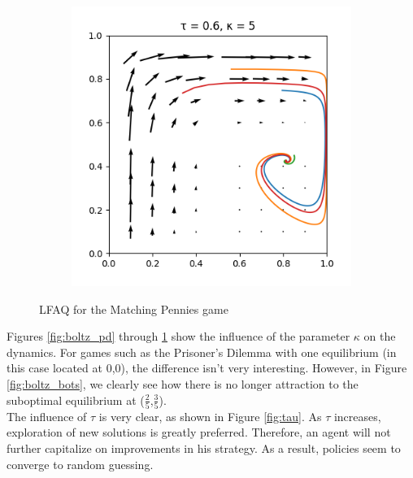 \documentclass[10pt,a4paper]{article}
\begin{document}
\begin{figure}[h]
\begin{subfigure}[b]{0.30\textwidth}
    \end{subfigure}
    \begin{subfigure}[b]{0.30\textwidth}
        \includegraphics[width=\textwidth]{Figures/boltzmann_mp_5.png}
    \end{subfigure}
    \caption{LFAQ for the Matching Pennies game}
    \label{fig:boltz_mp}
\end{figure}

Figures \ref{fig:boltz_pd} through \ref{fig:boltz_mp} show the influence of the parameter $\kappa$ on the dynamics. For games such as the Prisoner's Dilemma with one equilibrium (in this case located at 0,0), the difference isn't very interesting. However, in Figure \ref{fig:boltz_bots}, we clearly see how there is no longer attraction to the suboptimal equilibrium at ($\frac{2}{5}$,$\frac{3}{5}$).
\\
The influence of $\tau$ is very clear, as shown in Figure \ref{fig:tau}. As $\tau$ increases, exploration of new solutions is greatly preferred. Therefore, an agent will not further capitalize on improvements in his strategy. As a result, policies seem to converge to random guessing.
\end{document}
